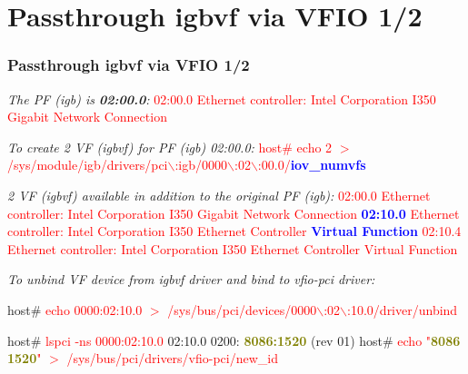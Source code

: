 \documentclass[aspectratio=169]{beamer}
\begin{document}
\section{Passthrough igbvf via VFIO 1/2}
\begin{frame}
\frametitle{Passthrough igbvf via VFIO 1/2}
\begin{block}{}
\small
\textit{The PF (igb) is \textbf{02:00.0}:} \newline
\textcolor{red}{02:00.0 Ethernet controller: Intel Corporation I350 Gigabit Network Connection}

\vspace{2 mm}

\textit{To create 2 VF (igbvf) for PF (igb) 02:00.0:} \newline
\textcolor{red}{host\# echo 2 $>$ /sys/module/igb/drivers/pci$\backslash$:igb/0000$\backslash$:02$\backslash$:00.0/\textbf{\textcolor{blue}{iov\_numvfs}}}

\vspace{2 mm}

\textit{2 VF (igbvf) available in addition to the original PF (igb):} \newline
\textcolor{red}{02:00.0 Ethernet controller: Intel Corporation I350 Gigabit Network Connection} \newline
\textcolor{red}{\textbf{\textcolor{blue}{02:10.0}} Ethernet controller: Intel Corporation I350 Ethernet Controller \textbf{\textcolor{blue}{Virtual Function}}} \newline
\textcolor{red}{02:10.4 Ethernet controller: Intel Corporation I350 Ethernet Controller Virtual Function}
\end{block}
\begin{block}{}
\textit{To unbind VF device from igbvf driver and bind to vfio-pci driver:}

\vspace{2 mm}

host\# \textcolor{red}{echo 0000:02:10.0 $>$ /sys/bus/pci/devices/0000$\backslash$:02$\backslash$:10.0/driver/unbind}

\vspace{1 mm}

host\# \textcolor{red}{lspci -ns 0000:02:10.0} \newline
{\small 02:10.0 0200: \textbf{\textcolor{olive}{8086:1520}} (rev 01)} \newline
host\# \textcolor{red}{echo "\textbf{\textcolor{olive}{8086 1520}}" $>$ /sys/bus/pci/drivers/vfio-pci/new\_id}
\end{block}
\end{frame}
\end{document}
